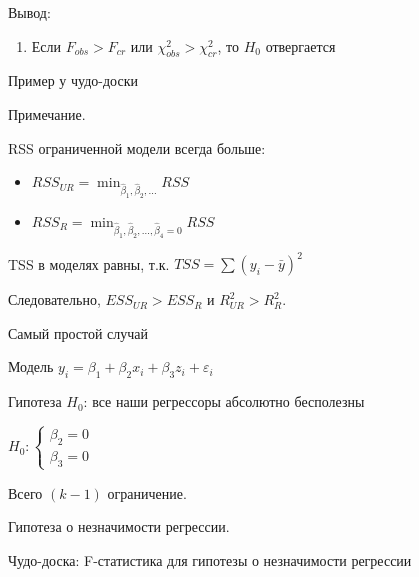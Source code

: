 \documentclass[ignorenonframetext,]{beamer}
\begin{document}
\begin{frame}{Вывод:}

\begin{enumerate}
\def\labelenumi{\arabic{enumi}.}
\setcounter{enumi}{3}
\itemsep1pt\parskip0pt
\item
  Если $F_{obs}>F_{cr}$ или $\chi^2_{obs}>\chi^2_{cr}$, то $H_0$
  отвергается
\end{enumerate}

\end{frame}

\begin{frame}{Пример у чудо-доски}

\end{frame}

\begin{frame}{Примечание.}

RSS ограниченной модели всегда больше:

\begin{itemize}
\item
  $RSS_{UR} = \min_{\hat{\beta}_1, \hat{\beta}_2, \ldots} RSS$
\item
  $RSS_{R} = \min_{\hat{\beta}_1, \hat{\beta}_2, \ldots, \hat{\beta}_4=0} RSS$
\end{itemize}

TSS в моделях равны, т.к. $TSS=\sum ( y_i -\bar{y})^2$

Следовательно, $ESS_{UR}>ESS_R$ и $R^2_{UR}>R^2_R$.

\end{frame}

\begin{frame}{Самый простой случай}

Модель $y_i = \beta_1 + \beta_2 x_i + \beta_3 z_i + \varepsilon_i$

Гипотеза $H_0$: все наши регрессоры абсолютно бесполезны

$H_0: \begin{cases} \beta_2 =0 \\ \beta_3 = 0 \end{cases}$

Всего $(k-1)$ ограничение.

Гипотеза о незначимости регрессии.

\end{frame}

\begin{frame}{Чудо-доска: F-статистика для гипотезы о незначимости
регрессии}

\end{frame}
\end{document}
